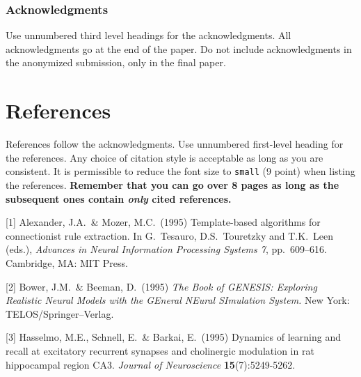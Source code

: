 \documentclass{article}
\begin{document}
\subsubsection*{Acknowledgments}

Use unnumbered third level headings for the acknowledgments. All
acknowledgments go at the end of the paper. Do not include
acknowledgments in the anonymized submission, only in the final paper.

\section*{References}

References follow the acknowledgments. Use unnumbered first-level
heading for the references. Any choice of citation style is acceptable
as long as you are consistent. It is permissible to reduce the font
size to \verb+small+ (9 point) when listing the references. {\bf
  Remember that you can go over 8 pages as long as the subsequent ones contain
  \emph{only} cited references.}
\medskip

\small

[1] Alexander, J.A.\ \& Mozer, M.C.\ (1995) Template-based algorithms
for connectionist rule extraction. In G.\ Tesauro, D.S.\ Touretzky and
T.K.\ Leen (eds.), {\it Advances in Neural Information Processing
  Systems 7}, pp.\ 609--616. Cambridge, MA: MIT Press.

[2] Bower, J.M.\ \& Beeman, D.\ (1995) {\it The Book of GENESIS:
  Exploring Realistic Neural Models with the GEneral NEural SImulation
  System.}  New York: TELOS/Springer--Verlag.

[3] Hasselmo, M.E., Schnell, E.\ \& Barkai, E.\ (1995) Dynamics of
learning and recall at excitatory recurrent synapses and cholinergic
modulation in rat hippocampal region CA3. {\it Journal of
  Neuroscience} {\bf 15}(7):5249-5262.
\end{document}
